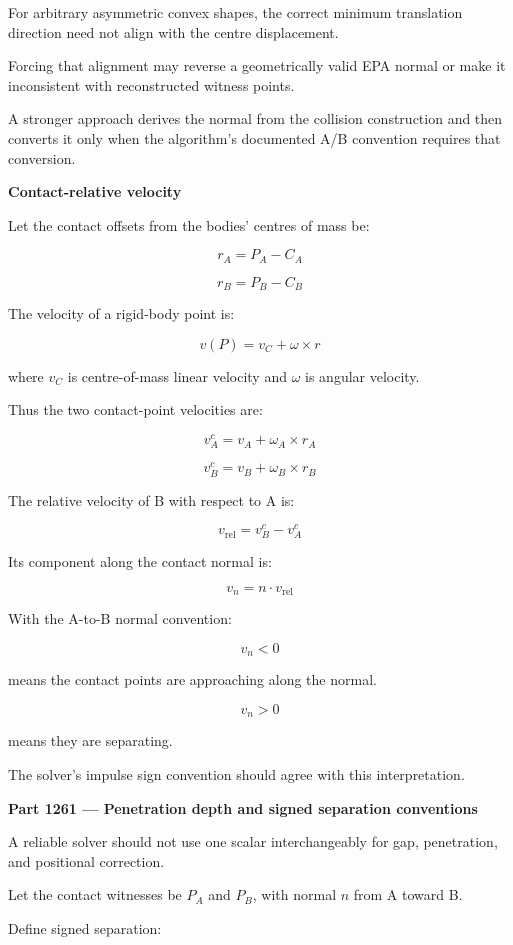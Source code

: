 For arbitrary asymmetric convex shapes, the correct minimum translation direction need not align with the centre displacement.

Forcing that alignment may reverse a geometrically valid EPA normal or make it inconsistent with reconstructed witness points.

A stronger approach derives the normal from the collision construction and then converts it only when the algorithm's documented A/B convention requires that conversion.

\textbf{Contact-relative velocity}

Let the contact offsets from the bodies' centres of mass be:

\[
r_A=P_A-C_A
\]

\[
r_B=P_B-C_B
\]

The velocity of a rigid-body point is:

\[
\boxed{ v(P)=v_C+\omega\times r }
\]

where \(v_C\) is centre-of-mass linear velocity and \(\omega\) is angular velocity.

Thus the two contact-point velocities are:

\[
v_A^c=v_A+\omega_A\times r_A
\]

\[
v_B^c=v_B+\omega_B\times r_B
\]

The relative velocity of B with respect to A is:

\[
\boxed{ v_{\mathrm{rel}}=v_B^c-v_A^c }
\]

Its component along the contact normal is:

\[
\boxed{ v_n=n\cdot v_{\mathrm{rel}} }
\]

With the A-to-B normal convention:

\[
v_n<0
\]

means the contact points are approaching along the normal.

\[
v_n>0
\]

means they are separating.

The solver's impulse sign convention should agree with this interpretation.

\textbf{Part 1261 --- Penetration depth and signed separation conventions}

A reliable solver should not use one scalar interchangeably for gap, penetration, and positional correction.

Let the contact witnesses be \(P_A\) and \(P_B\), with normal \(n\) from A toward B.

Define signed separation:

